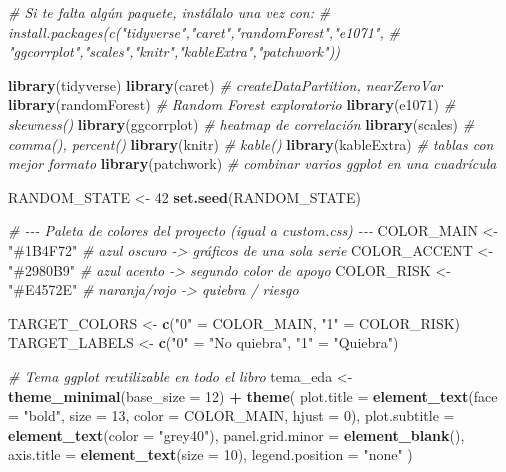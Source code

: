\documentclass[
]{book}
\newenvironment{Shaded}{\begin{snugshade}}{\end{snugshade}}
\newcommand{\AttributeTok}[1]{\textcolor[rgb]{0.13,0.29,0.53}{#1}}
\newcommand{\CommentTok}[1]{\textcolor[rgb]{0.56,0.35,0.01}{\textit{#1}}}
\newcommand{\DecValTok}[1]{\textcolor[rgb]{0.00,0.00,0.81}{#1}}
\newcommand{\FunctionTok}[1]{\textcolor[rgb]{0.13,0.29,0.53}{\textbf{#1}}}
\newcommand{\NormalTok}[1]{#1}
\newcommand{\OtherTok}[1]{\textcolor[rgb]{0.56,0.35,0.01}{#1}}
\newcommand{\SpecialCharTok}[1]{\textcolor[rgb]{0.81,0.36,0.00}{\textbf{#1}}}
\newcommand{\StringTok}[1]{\textcolor[rgb]{0.31,0.60,0.02}{#1}}
\newcounter{none} %
\begin{document}
\begin{Shaded}
\begin{Highlighting}[]
\CommentTok{\# Si te falta algún paquete, instálalo una vez con:}
\CommentTok{\# install.packages(c("tidyverse","caret","randomForest","e1071",}
\CommentTok{\#                     "ggcorrplot","scales","knitr","kableExtra","patchwork"))}

\FunctionTok{library}\NormalTok{(tidyverse)}
\FunctionTok{library}\NormalTok{(caret)          }\CommentTok{\# createDataPartition, nearZeroVar}
\FunctionTok{library}\NormalTok{(randomForest)   }\CommentTok{\# Random Forest exploratorio}
\FunctionTok{library}\NormalTok{(e1071)          }\CommentTok{\# skewness()}
\FunctionTok{library}\NormalTok{(ggcorrplot)     }\CommentTok{\# heatmap de correlación}
\FunctionTok{library}\NormalTok{(scales)         }\CommentTok{\# comma(), percent()}
\FunctionTok{library}\NormalTok{(knitr)          }\CommentTok{\# kable()}
\FunctionTok{library}\NormalTok{(kableExtra)     }\CommentTok{\# tablas con mejor formato}
\FunctionTok{library}\NormalTok{(patchwork)      }\CommentTok{\# combinar varios ggplot en una cuadrícula}

\NormalTok{RANDOM\_STATE }\OtherTok{\textless{}{-}} \DecValTok{42}
\FunctionTok{set.seed}\NormalTok{(RANDOM\_STATE)}

\CommentTok{\# {-}{-}{-} Paleta de colores del proyecto (igual a custom.css) {-}{-}{-}}
\NormalTok{COLOR\_MAIN   }\OtherTok{\textless{}{-}} \StringTok{"\#1B4F72"}   \CommentTok{\# azul oscuro {-}\textgreater{} gráficos de una sola serie}
\NormalTok{COLOR\_ACCENT }\OtherTok{\textless{}{-}} \StringTok{"\#2980B9"}   \CommentTok{\# azul acento {-}\textgreater{} segundo color de apoyo}
\NormalTok{COLOR\_RISK   }\OtherTok{\textless{}{-}} \StringTok{"\#E4572E"}   \CommentTok{\# naranja/rojo {-}\textgreater{} quiebra / riesgo}

\NormalTok{TARGET\_COLORS }\OtherTok{\textless{}{-}} \FunctionTok{c}\NormalTok{(}\StringTok{"0"} \OtherTok{=}\NormalTok{ COLOR\_MAIN, }\StringTok{"1"} \OtherTok{=}\NormalTok{ COLOR\_RISK)}
\NormalTok{TARGET\_LABELS }\OtherTok{\textless{}{-}} \FunctionTok{c}\NormalTok{(}\StringTok{"0"} \OtherTok{=} \StringTok{"No quiebra"}\NormalTok{, }\StringTok{"1"} \OtherTok{=} \StringTok{"Quiebra"}\NormalTok{)}

\CommentTok{\# Tema ggplot reutilizable en todo el libro}
\NormalTok{tema\_eda }\OtherTok{\textless{}{-}} \FunctionTok{theme\_minimal}\NormalTok{(}\AttributeTok{base\_size =} \DecValTok{12}\NormalTok{) }\SpecialCharTok{+}
  \FunctionTok{theme}\NormalTok{(}
    \AttributeTok{plot.title    =} \FunctionTok{element\_text}\NormalTok{(}\AttributeTok{face =} \StringTok{"bold"}\NormalTok{, }\AttributeTok{size =} \DecValTok{13}\NormalTok{, }\AttributeTok{color =}\NormalTok{ COLOR\_MAIN, }\AttributeTok{hjust =} \DecValTok{0}\NormalTok{),}
    \AttributeTok{plot.subtitle =} \FunctionTok{element\_text}\NormalTok{(}\AttributeTok{color =} \StringTok{"grey40"}\NormalTok{),}
    \AttributeTok{panel.grid.minor =} \FunctionTok{element\_blank}\NormalTok{(),}
    \AttributeTok{axis.title =} \FunctionTok{element\_text}\NormalTok{(}\AttributeTok{size =} \DecValTok{10}\NormalTok{),}
    \AttributeTok{legend.position =} \StringTok{"none"}
\NormalTok{  )}


\end{Highlighting}
\end{Shaded}
\end{document}
